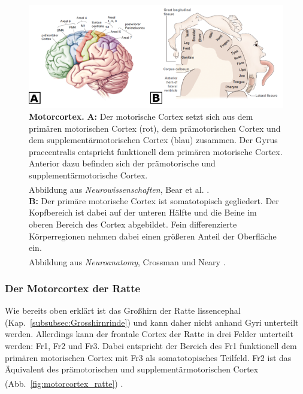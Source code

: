 \documentclass[12pt,a4paper,pdftex]{article}
\begin{document}
\begin{figure}[H]
    \centering
    \includegraphics[width=\textwidth]{pictures/Bilder_Laura/Motorcortex_2.png}
    \caption[Motorcortex]{\textbf{Motorcortex.} \textbf{A:} Der motorische Cortex setzt sich aus dem primären motorischen Cortex (rot), dem prämotorischen Cortex und dem supplementärmotorischen Cortex (blau) zusammen. Der Gyrus praecentralis entspricht funktionell dem primären motorische Cortex. Anterior dazu befinden sich der prämotorische und supplementärmotorische Cortex. \\
    Abbildung aus \textit{Neurowissenschaften}, Bear et al. \textsuperscript{\cite[14]{neurowissenschaften_baer}}.\\ \textbf{B:} Der primäre motorische Cortex ist somatotopisch gegliedert. Der Kopfbereich ist dabei auf der unteren Hälfte und die Beine im oberen Bereich des Cortex abgebildet. Fein differenzierte Körperregionen nehmen dabei einen größeren Anteil der Oberfläche ein. \\
    Abbildung aus \textit{Neuroanatomy}, Crossman und Neary \textsuperscript{\cite[8]{crossman2014neuroanatomy}}.}
    \label{fig:motorkortex}
\end{figure}

\subsubsection*{Der Motorcortex der Ratte}
Wie bereits oben erklärt ist das Großhirn der Ratte lissencephal (Kap.~\ref{subsubsec:Grosshirnrinde}) und kann daher nicht anhand Gyri unterteilt werden.  
Allerdings kann der frontale Cortex der Ratte in drei Felder unterteilt werden: Fr1, Fr2 und Fr3. Dabei entspricht der Bereich des Fr1 funktionell dem primären motorischen Cortex mit Fr3 als somatotopisches Teilfeld. Fr2 ist das Äquivalent des prämotorischen und supplementärmotorischen Cortex (Abb.~\ref{fig:motorcortex_ratte}) \textsuperscript{\cite[22]{paxinos2014rat}}.  
\end{document}
